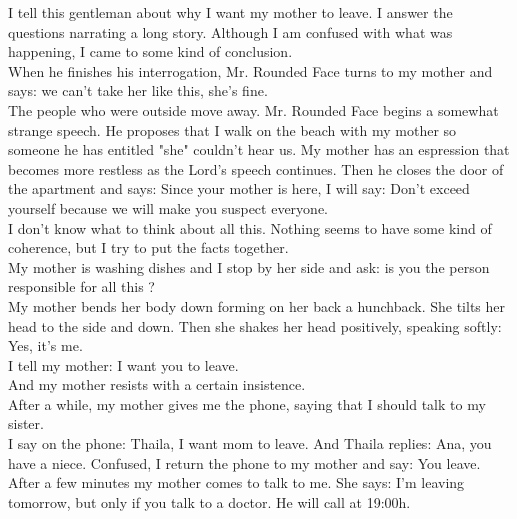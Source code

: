 \documentclass[11pt]{book}
\begin{document}
\noindent I tell this gentleman about why I want my mother to leave. I answer the questions narrating a long story. Although I am confused with what was happening, I came to some kind of conclusion. \\

\noindent When he finishes his interrogation, Mr. Rounded Face turns to my mother and says: we can't take her like this, she's fine. \\

\noindent The people who were outside move away. Mr. Rounded Face begins a somewhat strange speech. He proposes that I walk on the beach with my mother so someone he has entitled "she" couldn't hear us. My mother has an espression that becomes more restless as the Lord's speech continues. Then he closes the door of the apartment and says: Since your mother is here, I will say: Don't exceed yourself because we will make you suspect everyone.  \\

\noindent I don't know what to think about all this. Nothing seems to have some kind of coherence, but I try to put the facts together. \\

\noindent My mother is washing dishes and I stop by her side and ask: is you the person responsible for all this ? \\

\noindent My mother bends her body down forming on her back a hunchback. She tilts her head to the side and down. Then she shakes her head positively, speaking softly: Yes, it's me. \\

\noindent I tell my mother: I want you to leave. \\

\noindent And my mother resists with a certain insistence. \\

\noindent After a while, my mother gives me the phone, saying that I should talk to my sister. \\

\noindent I say on the phone: Thaila, I want mom to leave. And Thaila replies: Ana, you have a niece. Confused, I return the phone to my mother and say: You leave. \\

\noindent After a few minutes my mother comes to talk to me. She says: I'm leaving tomorrow, but only if you talk to a doctor. He will call at 19:00h. \\
\end{document}
